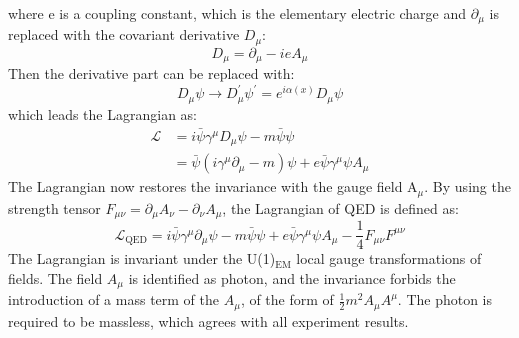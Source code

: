 where e is a coupling constant, which is the elementary electric charge 
and $\partial_{\mu}$ is replaced with the covariant derivative $D_\mu$:
\begin{equation}
D_{\mu}=\partial_{\mu}-i e A_{\mu}
\end{equation}
Then the derivative part can be replaced with:
\begin{equation}
D_{\mu} \psi \rightarrow D_{\mu}^{\prime} \psi^{\prime}=e^{i \alpha(x)} D_{\mu} \psi
\end{equation}
which leads the Lagrangian as:
\begin{equation}
\begin{aligned}
\mathcal{L} &=i \bar{\psi} \gamma^{\mu} D_{\mu} \psi-m \bar{\psi} \psi \\
&=\bar{\psi}\left(i \gamma^{\mu} \partial_{\mu}-m\right) \psi+e \bar{\psi} \gamma^{\mu} \psi A_{\mu}
\end{aligned}
\end{equation}
The Lagrangian now restores the invariance with the gauge field A$_\mu$. By using the strength tensor $F_{\mu \nu}=\partial_{\mu} A_{\nu}-\partial_{\nu} A_{\mu}$, the Lagrangian of QED is defined as:
\begin{equation}
\label{eqn:QEDLagrangian}
\mathcal{L}_{\mathrm{QED}}=i \bar{\psi} \gamma^{\mu} \partial_{\mu} \psi-m \bar{\psi} \psi+e \bar{\psi} \gamma^{\mu} \psi A_{\mu}-\frac{1}{4} F_{\mu \nu} F^{\mu \nu}
\end{equation}
The Lagrangian is invariant under the U(1)$_{\mathrm{EM}}$ local gauge transformations of fields. 
The field $A_\mu$ is identified as photon, and the invariance forbids the introduction of a mass term of the $A_\mu$, of the form of $\frac{1}{2}m^2 A_\mu A^\mu$. The photon is required to be massless, which agrees with all experiment results.
\\

